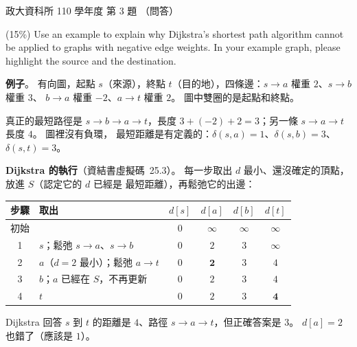 \begin{pastexam}[label={px:nccu-110-dsa-03}]{政大資科所 110 學年度 第 3 題}
（問答）

(15\%) Use an example to explain why Dijkstra's shortest path algorithm cannot be applied to graphs
with negative edge weights. In your example graph, please highlight the source and the destination.
\end{pastexam}

\begin{pastsoln}
\textbf{例子}。 有向圖，起點 $s$（來源），終點 $t$（目的地），四條邊：$s \to a$ 權重 $2$、$s \to b$ 權重 $3$、
$b \to a$ 權重 $-2$、$a \to t$ 權重 $2$。 圖中雙圈的是起點和終點。
\begin{center}
\end{center}
真正的最短路徑是 $s \to b \to a \to t$，長度 $3 + (-2) + 2 = 3$；另一條 $s \to a \to t$ 長度 $4$。 圖裡沒有負環，
最短距離是有定義的：$\delta(s, a) = 1$、$\delta(s, b) = 3$、$\delta(s, t) = 3$。

\textbf{Dijkstra 的執行}（資結書虛擬碼~25.3）。 每一步取出 $d$ 最小、還沒確定的頂點，放進 $S$（認定它的 $d$ 已經是
最短距離），再鬆弛它的出邊：
\begin{center}
\begin{tabular}{clcccc}
\toprule
步驟 & 取出 & $d[s]$ & $d[a]$ & $d[b]$ & $d[t]$ \\
\midrule
初始 & & $0$ & $\infty$ & $\infty$ & $\infty$ \\
1 & $s$；鬆弛 $s \to a$、$s \to b$ & $0$ & $2$ & $3$ & $\infty$ \\
2 & $a$（$d = 2$ 最小）；鬆弛 $a \to t$ & $0$ & $\mathbf{2}$ & $3$ & $4$ \\
3 & $b$；$a$ 已經在 $S$，不再更新 & $0$ & $2$ & $3$ & $4$ \\
4 & $t$ & $0$ & $2$ & $3$ & $\mathbf{4}$ \\
\bottomrule
\end{tabular}
\end{center}
Dijkstra 回答 $s$ 到 $t$ 的距離是 $4$、路徑 $s \to a \to t$，但正確答案是 $3$。 $d[a] = 2$ 也錯了（應該是 $1$）。


\end{pastsoln}
